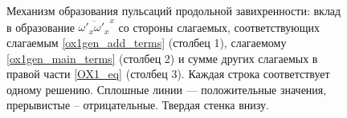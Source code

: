 \begin{figure}
\caption{Механизм образования пульсаций продольной завихренности: вклад в образование $\overline{\omega'_x\omega'_x}^x$ со стороны слагаемых, соответствующих слагаемым \eqref{ox1gen_add_terms} (столбец 1), слагаемому \eqref{ox1gen_main_terms} (столбец 2) и сумме других слагаемых в правой части \eqref{OX1_eq} (столбец 3). Каждая строка соответствует одному решению. Сплошные линии --- положительные значения, прерывистые -- отрицательные. Твердая стенка внизу. }
\label{ductTW_ox1gen_pic}
\end{figure}

